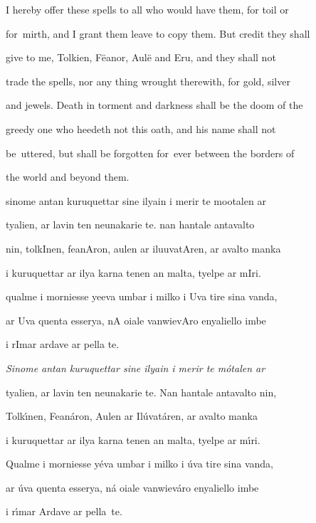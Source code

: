 
\pagestyle{empty}

\setlength{\parindent}{0pt}

\setlength{\parskip}{6pt}



\quenya



I hereby offer these spells to all who would have them, for toil or

for~mirth, and I grant them leave to copy them. But credit they shall

give to me, Tolkien, F\"eanor, Aul\"e and Eru, and they shall not

trade the spells, nor any thing wrought therewith, for gold, silver

and jewels. Death in torment and darkness shall be the doom of the

greedy one who heedeth not this oath, and his name shall not

be~uttered, but shall be forgotten for~ever between the borders of

the world and beyond them.



\begin{elvish}

  sinome antan kuruquettar sine ilyain i merir te mootalen ar

  tyalien, ar lavin ten neunakarie te. nan hantale antavalto

  nin, tolkInen, feanAron, aulen ar iluuvatAren, ar avalto manka

  i kuruquettar ar ilya karna tenen an malta, tyelpe ar mIri.

  qualme i morniesse yeeva umbar i milko i Uva tire sina vanda,

  ar Uva quenta esserya, nA oiale vanwievAro enyaliello imbe

  i rImar ardave ar pella te.

\end{elvish}



\it Sinome antan kuruquettar sine ilyain i merir te m\'otalen ar

tyalien, ar lavin ten neunakarie te. Nan hantale antavalto nin,

Tolk\'\i nen, Fean\'aron, Aulen ar Il\'uvat\'aren, ar avalto manka

i kuruquettar ar ilya karna tenen an malta, tyelpe ar m\'\i ri.

Qualme i morniesse y\'eva umbar i milko i \'uva tire sina vanda,

ar \'uva quenta esserya, n\'a oiale vanwiev\'aro enyaliello imbe

i r\'\i mar Ardave ar pella~te.



